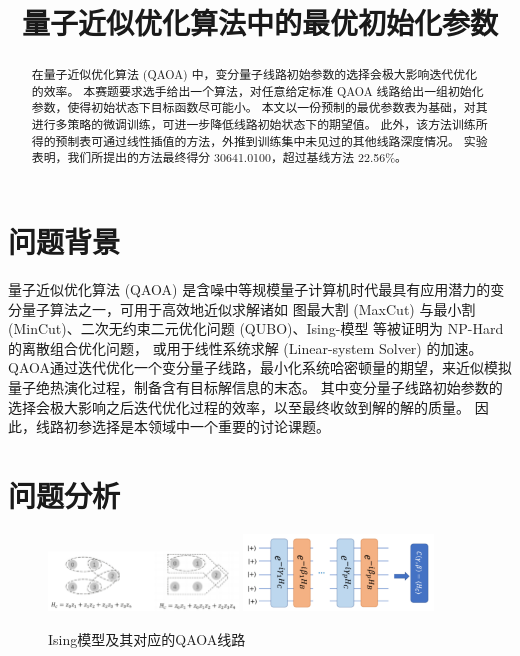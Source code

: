 \documentclass[withoutpreface,bwprint]{cumcmthesis}
\title{量子近似优化算法中的最优初始化参数}
\begin{document}
\maketitle
\begin{abstract}
在量子近似优化算法 (QAOA) 中，变分量子线路初始参数的选择会极大影响迭代优化的效率。
本赛题要求选手给出一个算法，对任意给定标准 QAOA 线路给出一组初始化参数，使得初始状态下目标函数尽可能小。
本文以一份预制的最优参数表为基础，对其进行多策略的微调训练，可进一步降低线路初始状态下的期望值。
此外，该方法训练所得的预制表可通过线性插值的方法，外推到训练集中未见过的其他线路深度情况。
实验表明，我们所提出的方法最终得分 30641.0100，超过基线方法 22.56\%。

\end{abstract}




\section{问题背景}

量子近似优化算法 (QAOA) 是含噪中等规模量子计算机时代最具有应用潜力的变分量子算法之一，可用于高效地近似求解诸如
图最大割 (MaxCut) 与最小割 (MinCut)、二次无约束二元优化问题 (QUBO)、Ising-模型 等被证明为 NP-Hard 的离散组合优化问题，
或用于线性系统求解 (Linear-system Solver) 的加速。
QAOA通过迭代优化一个变分量子线路，最小化系统哈密顿量的期望，来近似模拟量子绝热演化过程，制备含有目标解信息的末态。
其中变分量子线路初始参数的选择会极大影响之后迭代优化过程的效率，以至最终收敛到解的解的质量。
因此，线路初参选择是本领域中一个重要的讨论课题。


\section{问题分析}

\begin{figure}
	\centering
	{\includegraphics[width=0.45\textwidth]{figures/ising_model.png}}
	{\includegraphics[width=0.45\textwidth]{figures/qaoa_circ.png}}
	\caption{Ising模型及其对应的QAOA线路}
	\label{fig:ising-qaoa}
\end{figure}
\end{document}
